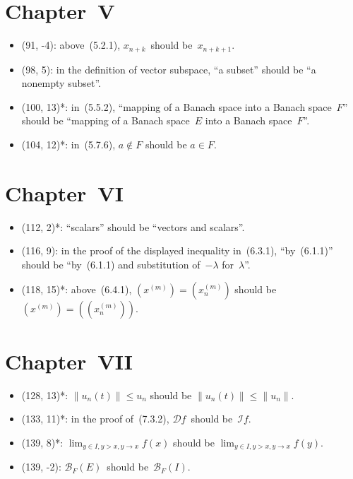 \documentclass[letterpaper,12pt]{article}
\newcommand{\B}{\mathcal{B}}
\renewcommand{\Im}{\mathcal{I}}
\newcommand{\norm}[1]{\lVert{#1}\rVert}
\begin{document}
\section*{Chapter~V}
\begin{itemize}
\item (91, -4): above~(5.2.1), \(x_{n+k}\)~should be~\(x_{n+k+1}\).
\item (98, 5): in the definition of vector subspace, ``a subset'' should be ``a nonempty subset''.
\item (100, 13)*: in~(5.5.2), ``mapping of a Banach space into a Banach space~\(F\)'' should be ``mapping of a Banach space~\(E\) into a Banach space~\(F\)''.
\item (104, 12)*: in~(5.7.6), \(a\not\in F\) should be \(a\in F\).
\end{itemize}

\section*{Chapter~VI}
\begin{itemize}
\item (112, 2)*: ``scalars'' should be ``vectors and scalars''.
\item (116, 9): in the proof of the displayed inequality in~(6.3.1), ``by~(6.1.1)'' should be ``by~(6.1.1) and substitution of~\(-\lambda\) for~\(\lambda\)''.
\item (118, 15)*: above~(6.4.1), \((x^{(m)})=(x^{(m)}_n)\) should be \((x^{(m)})=((x^{(m)}_n))\).
\end{itemize}

\section*{Chapter~VII}
\begin{itemize}
\item (128, 13)*: \(\norm{u_n(t)}\le u_n\) should be \(\norm{u_n(t)}\le\norm{u_n}\).
\item (133, 11)*: in the proof of~(7.3.2), \(\mathcal{D}f\)~should be~\(\Im f\).
\item (139, 8)*: \(\lim_{y\in I,y>x,y\to x}f(x)\) should be \(\lim_{y\in I,y>x,y\to x}f(y)\).
\item (139, -2): \(\B_F(E)\)~should be~\(\B_F(I)\).
\end{itemize}
\end{document}

